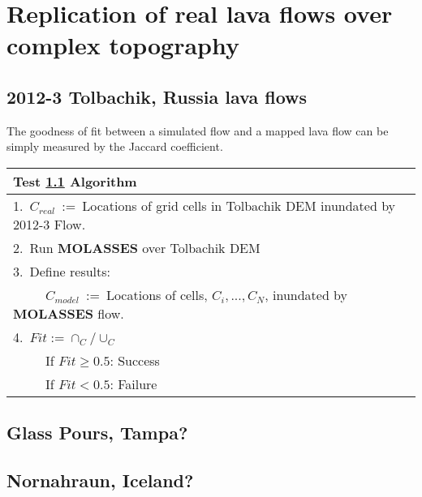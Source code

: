 \documentclass[12pt,letter]{article}
\newcommand{\tabitem}{~~\llap{\textbullet}~~}
\begin{document}
\section{Replication of real lava flows over complex topography}
\subsection{2012-3 Tolbachik, Russia lava flows}\label{test:Real_Tolbachik}
The goodness of fit between a simulated flow and a mapped lava flow can be simply measured by the Jaccard coefficient. 

\begin{center}
	\begin{tabular}{l}
		\toprule
		\textbf{Test \ref{test:Real_Tolbachik} Algorithm}\\
		\midrule
		1.~$C_{real}$~:=~Locations of grid cells in Tolbachik DEM inundated by 2012-3 Flow.\\
		2.~Run \textbf{MOLASSES} over Tolbachik DEM\\
		3.~Define results:\\
			~\tabitem $C_{model}$~:=~Locations of cells, $C_i,...,C_N$, inundated by \textbf{MOLASSES} flow.\\
		4.~$Fit:=\cap_C/\cup_C$\\
			~\tabitem If $Fit\ge0.5$: Success\\
			~\tabitem If $Fit<0.5$: Failure\\
		\bottomrule
	\end{tabular}
\end{center}

\subsection{Glass Pours, Tampa?}\label{test:Real_Glass}
\subsection{Nornahraun, Iceland?}\label{test:Real_Iceland}
\end{document}
